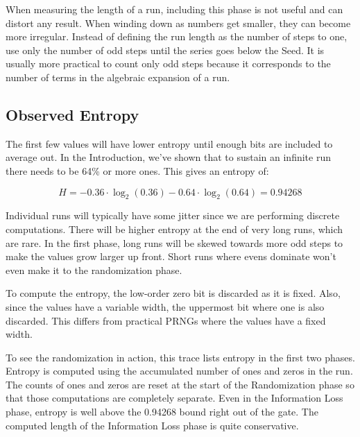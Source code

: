 \documentclass[letterpaper]{article}
\begin{document}
When measuring the length of a run, including this phase is not useful and can distort any result. When winding down as numbers get smaller, they can become more irregular. Instead of defining the run length as the number of steps to one, use only the number of odd steps until the series goes below the Seed. It is usually more practical to count only odd steps because it corresponds to the number of terms in the algebraic expansion of a run.

\subsection{Observed Entropy}

The first few values will have lower entropy until enough bits are included to average out. In the Introduction, we've shown that to sustain an infinite run there needs to be 64\% or more ones. This gives an entropy of:

\[ H = -0.36 \cdot \log_2(0.36) - 0.64 \cdot \log_2(0.64) = 0.94268 \]

Individual runs will typically have some jitter since we are performing discrete computations. There will be higher entropy at the end of very long runs, which are rare. In the first phase, long runs will be skewed towards more odd steps to make the values grow larger up front. Short runs where evens dominate won't even make it to the randomization phase.

To compute the entropy, the low-order zero bit is discarded as it is fixed. Also, since the values have a variable width, the uppermost bit where one is also discarded. This differs from practical PRNGs where the values have a fixed width.

To see the randomization in action, this trace lists entropy in the first two phases. Entropy is computed using the accumulated number of ones and zeros in the run. The counts of ones and zeros are reset at the start of the Randomization phase so that those computations are completely separate. Even in the Information Loss phase, entropy is well above the 0.94268 bound right out of the gate. The computed length of the Information Loss phase is quite conservative.
\end{document}
